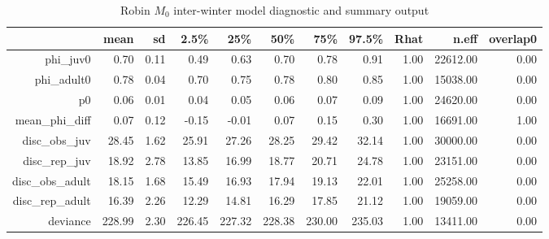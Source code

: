 \begin{table}[ht]
\centering
\begin{tabular}{rrrrrrrrrrr}
  \hline
 & mean & sd & 2.5\% & 25\% & 50\% & 75\% & 97.5\% & Rhat & n.eff & overlap0 \\ 
  \hline
phi\_juv0 & 0.70 & 0.11 & 0.49 & 0.63 & 0.70 & 0.78 & 0.91 & 1.00 & 22612.00 & 0.00 \\ 
  phi\_adult0 & 0.78 & 0.04 & 0.70 & 0.75 & 0.78 & 0.80 & 0.85 & 1.00 & 15038.00 & 0.00 \\ 
  p0 & 0.06 & 0.01 & 0.04 & 0.05 & 0.06 & 0.07 & 0.09 & 1.00 & 24620.00 & 0.00 \\ 
  mean\_phi\_diff & 0.07 & 0.12 & -0.15 & -0.01 & 0.07 & 0.15 & 0.30 & 1.00 & 16691.00 & 1.00 \\ 
  disc\_obs\_juv & 28.45 & 1.62 & 25.91 & 27.26 & 28.25 & 29.42 & 32.14 & 1.00 & 30000.00 & 0.00 \\ 
  disc\_rep\_juv & 18.92 & 2.78 & 13.85 & 16.99 & 18.77 & 20.71 & 24.78 & 1.00 & 23151.00 & 0.00 \\ 
  disc\_obs\_adult & 18.15 & 1.68 & 15.49 & 16.93 & 17.94 & 19.13 & 22.01 & 1.00 & 25258.00 & 0.00 \\ 
  disc\_rep\_adult & 16.39 & 2.26 & 12.29 & 14.81 & 16.29 & 17.85 & 21.12 & 1.00 & 19059.00 & 0.00 \\ 
  deviance & 228.99 & 2.30 & 226.45 & 227.32 & 228.38 & 230.00 & 235.03 & 1.00 & 13411.00 & 0.00 \\ 
   \hline
\end{tabular}
\caption{Robin $M_0$ inter-winter model diagnostic and summary output} 
\label{tab:robin_m0_inter_summary_output}
\end{table}
